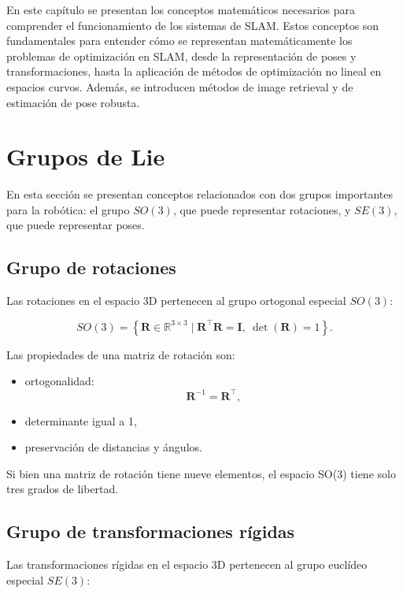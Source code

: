 En este capítulo se presentan los conceptos matemáticos necesarios para comprender el funcionamiento de los sistemas de SLAM. Estos conceptos son fundamentales para entender cómo se representan matemáticamente los problemas de optimización en SLAM, desde la representación de poses y transformaciones, hasta la aplicación de métodos de optimización no lineal en espacios curvos. Además, se introducen métodos de image retrieval y de estimación de pose robusta.

\section{Grupos de Lie}
\label{sec:lie}


En esta sección se presentan conceptos relacionados con dos grupos importantes para la robótica: el grupo $SO(3)$, que puede representar rotaciones, y $SE(3)$, que puede representar poses.

\subsection{Grupo de rotaciones}

Las rotaciones en el espacio 3D pertenecen al grupo ortogonal especial $SO(3)$:

\[
SO(3) = \left\{ \mathbf{R} \in \mathbb{R}^{3\times3} \mid \mathbf{R}^\top \mathbf{R} = \mathbf{I},\ \det(\mathbf{R}) = 1 \right\}.
\]

Las propiedades de una matriz de rotación son:

\begin{itemize}
    \item ortogonalidad:
    \[
        \mathbf{R}^{-1} = \mathbf{R}^\top,
    \]
    \item determinante igual a 1,
    \item preservación de distancias y ángulos.
\end{itemize}

Si bien una matriz de rotación tiene nueve elementos, el espacio SO(3) tiene solo tres grados de libertad.

\subsection{Grupo de transformaciones rígidas}

Las transformaciones rígidas en el espacio 3D pertenecen al grupo euclídeo especial $SE(3)$:

